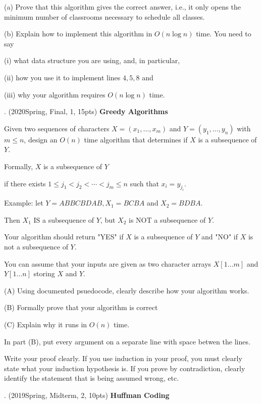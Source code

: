 \begin{spacing}{1.3}
    (a) Prove that this algorithm gives the correct answer, i.e., it only opens the minimum number of classrooms necessary to schedule all classes.
    
    (b) Explain how to implement this algorithm in $O(n \log n)$ time. You need to say
    
    \qquad (i) what data structure you are using, and, in particular,

    \qquad (ii) how you use it to implement lines $4,5,8$ and

    \qquad (iii) why your algorithm requires $O(n \log n)$ time.

    . (2020Spring, Final, 1, 15pts) {\bf Greedy Algorithms}

    Given two sequences of characters $X=\left(x_{1}, \ldots, x_{m}\right)$ and $Y=\left(y_{1}, \ldots, y_{n}\right)$ with $m \leq n$, design an $O(n)$ time algorithm that determines if $X$ is a subsequence of $Y$.
    
    Formally, $X$ is a subsequence of $Y$

    \qquad if there exists $1 \leq j_{1}<j_{2}<\cdots<j_{m} \leq n$ such that $x_{i}=y_{j_{i}}$.
    
    Example: let $Y=A B B C B D A B, X_{1}=B C B A$ and $X_{2}=B D B A$.
    
    Then $X_{1}$ IS a subsequence of $Y$, but $X_{2}$ is NOT a subsequence of $Y$.
    
    Your algorithm should return "YES" if $X$ is a subsequence of $Y$ and "NO" if $X$ is not a subsequence of $Y$.
    
    You can assume that your inputs are given as two character arrays $X[1 \ldots m]$ and $Y[1 \ldots n]$ storing $X$ and $Y$.
    
    (A) Using documented psuedocode, clearly describe how your algorithm works.
    
    (B) Formally prove that your algorithm is correct
    
    (C) Explain why it runs in $O(n)$ time.
    
    In part (B), put every argument on a separate line with space betwen the lines.
    
    Write your proof clearly. If you use induction in your proof, you must clearly state what your induction hypothesis is. If you prove by contradiction, clearly identify the statement that is being assumed wrong, etc.


    . (2019Spring, Midterm, 2, 10pts) {\bf Huffman Coding}


\end{spacing}
